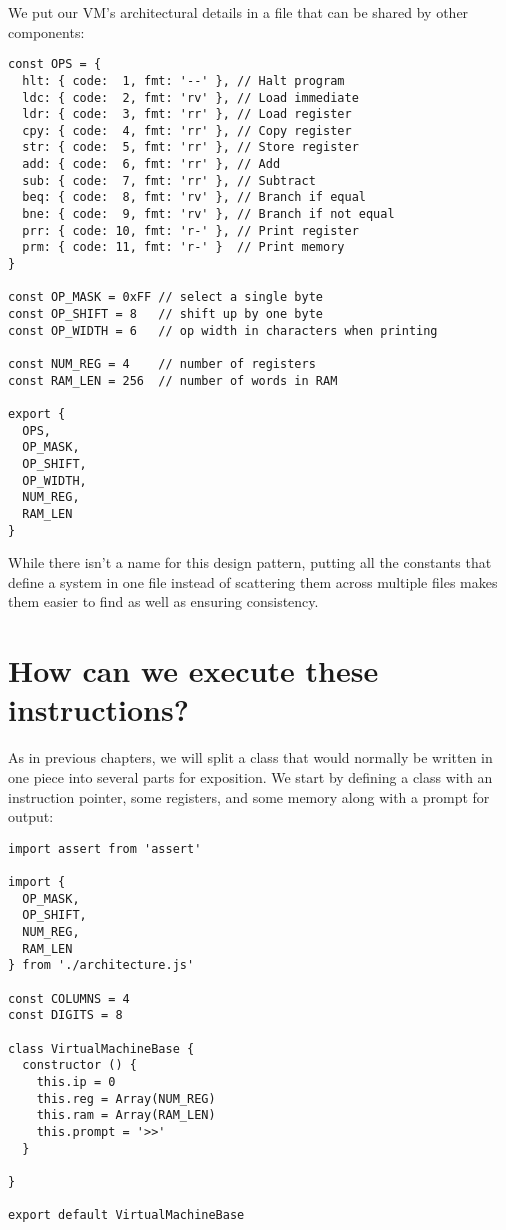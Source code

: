 \documentclass[krantzl]{krantz}
\begin{document}
We put our VM's architectural details in a file
that can be shared by other components:


\begin{lstlisting}[frame=single,frameround=tttt]
const OPS = {
  hlt: { code:  1, fmt: '--' }, // Halt program
  ldc: { code:  2, fmt: 'rv' }, // Load immediate
  ldr: { code:  3, fmt: 'rr' }, // Load register
  cpy: { code:  4, fmt: 'rr' }, // Copy register
  str: { code:  5, fmt: 'rr' }, // Store register
  add: { code:  6, fmt: 'rr' }, // Add
  sub: { code:  7, fmt: 'rr' }, // Subtract
  beq: { code:  8, fmt: 'rv' }, // Branch if equal
  bne: { code:  9, fmt: 'rv' }, // Branch if not equal
  prr: { code: 10, fmt: 'r-' }, // Print register
  prm: { code: 11, fmt: 'r-' }  // Print memory
}

const OP_MASK = 0xFF // select a single byte
const OP_SHIFT = 8   // shift up by one byte
const OP_WIDTH = 6   // op width in characters when printing

const NUM_REG = 4    // number of registers
const RAM_LEN = 256  // number of words in RAM

export {
  OPS,
  OP_MASK,
  OP_SHIFT,
  OP_WIDTH,
  NUM_REG,
  RAM_LEN
}
\end{lstlisting}



\noindent While there isn't a name for this design pattern,
putting all the constants that define a system in one file
instead of scattering them across multiple files
makes them easier to find as well as ensuring consistency.

\section{How can we execute these instructions?}\label{virtual-machine-execute}


As in previous chapters,
we will split a class that would normally be written in one piece into several parts for exposition.
We start by defining a class with an instruction pointer, some registers, and some memory
along with a prompt for output:


\begin{lstlisting}[frame=single,frameround=tttt]
import assert from 'assert'

import {
  OP_MASK,
  OP_SHIFT,
  NUM_REG,
  RAM_LEN
} from './architecture.js'

const COLUMNS = 4
const DIGITS = 8

class VirtualMachineBase {
  constructor () {
    this.ip = 0
    this.reg = Array(NUM_REG)
    this.ram = Array(RAM_LEN)
    this.prompt = '>>'
  }

}

export default VirtualMachineBase
\end{lstlisting}
\end{document}
